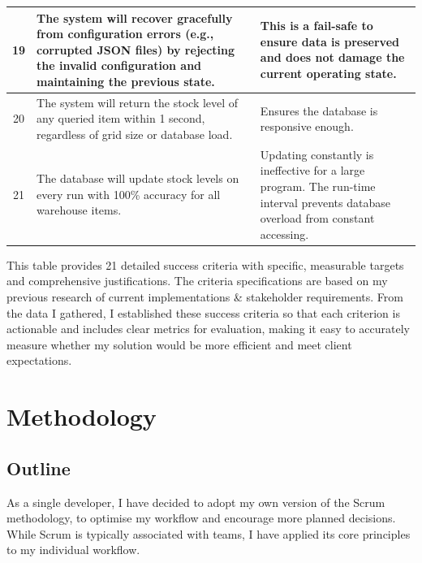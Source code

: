 \begin{table}[htbp]
\begin{tabularx}{\textwidth}{|c|X|X|}
\hline
19 & The system will recover gracefully from configuration errors (e.g., corrupted JSON files) by rejecting the invalid configuration and maintaining the previous state. & This is a fail-safe to ensure data is preserved and does not damage the current operating state. \\
\hline
20 & The system will return the stock level of any queried item within 1 second, regardless of grid size or database load. & Ensures the database is responsive enough. \\
\hline
21 & The database will update stock levels on every run with 100\% accuracy for all warehouse items. & Updating constantly is ineffective for a large program. The run-time interval prevents database overload from constant accessing. \\
\hline
\end{tabularx}
\end{table}

\textbf{}
\newline
This table provides 21 detailed success criteria with specific, measurable targets and comprehensive justifications. The criteria specifications are based on my previous research of current implementations \& stakeholder requirements. From the data I gathered, I established these success criteria so that each criterion is actionable and includes clear metrics for evaluation, making it easy to accurately measure whether my solution would be more efficient and meet client expectations.

\newpage

\section{Methodology}

\subsection{Outline}

As a single developer, I have decided to adopt my own version of the Scrum methodology, to optimise my workflow and encourage more planned decisions. While Scrum is typically associated with teams, I have applied its core principles to my individual workflow. \newline


